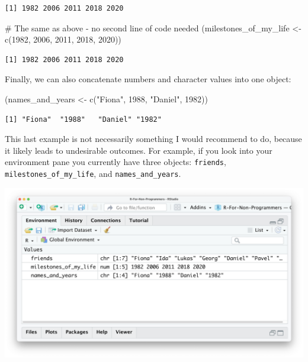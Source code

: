 \documentclass[
  letterpaper,
]{krantz}
\makeatletter
\newenvironment{Shaded}{\begin{snugshade}}{\end{snugshade}}
\newcommand{\CommentTok}[1]{\textcolor[rgb]{0.37,0.37,0.37}{#1}}
\newcommand{\DecValTok}[1]{\textcolor[rgb]{0.68,0.00,0.00}{#1}}
\newcommand{\FunctionTok}[1]{\textcolor[rgb]{0.28,0.35,0.67}{#1}}
\newcommand{\NormalTok}[1]{\textcolor[rgb]{0.00,0.23,0.31}{#1}}
\newcommand{\OtherTok}[1]{\textcolor[rgb]{0.00,0.23,0.31}{#1}}
\newcommand{\StringTok}[1]{\textcolor[rgb]{0.13,0.47,0.30}{#1}}
\newenvironment{kframe}{%
\medskip{}
\setlength{\fboxsep}{.8em}
 \def\at@end@of@kframe{}%
 \ifinner\ifhmode%
  \def\at@end@of@kframe{\end{minipage}}%
  \begin{minipage}{\columnwidth}%
 \fi\fi%
 \def\FrameCommand##1{\hskip\@totalleftmargin \hskip-\fboxsep
 \colorbox{shadecolor}{##1}\hskip-\fboxsep
     \hskip-\linewidth \hskip-\@totalleftmargin \hskip\columnwidth}%
 \MakeFramed {\advance\hsize-\width
   \@totalleftmargin\z@ \linewidth\hsize
   \@setminipage}}%
 {\par\unskip\endMakeFramed%
 \at@end@of@kframe}
\renewenvironment{Shaded}{\begin{kframe}}{\end{kframe}}
\makeatother
\begin{document}
\begin{verbatim}
[1] 1982 2006 2011 2018 2020
\end{verbatim}

\begin{Shaded}
\begin{Highlighting}[]
\CommentTok{\# The same as above {-} no second line of code needed}
\NormalTok{(milestones\_of\_my\_life }\OtherTok{\textless{}{-}} \FunctionTok{c}\NormalTok{(}\DecValTok{1982}\NormalTok{, }\DecValTok{2006}\NormalTok{, }\DecValTok{2011}\NormalTok{, }\DecValTok{2018}\NormalTok{, }\DecValTok{2020}\NormalTok{))}
\end{Highlighting}
\end{Shaded}

\begin{verbatim}
[1] 1982 2006 2011 2018 2020
\end{verbatim}

Finally, we can also concatenate numbers and character values into one
object:

\begin{Shaded}
\begin{Highlighting}[]
\NormalTok{(names\_and\_years }\OtherTok{\textless{}{-}} \FunctionTok{c}\NormalTok{(}\StringTok{"Fiona"}\NormalTok{, }\DecValTok{1988}\NormalTok{, }\StringTok{"Daniel"}\NormalTok{, }\DecValTok{1982}\NormalTok{))}
\end{Highlighting}
\end{Shaded}

\begin{verbatim}
[1] "Fiona"  "1988"   "Daniel" "1982"  
\end{verbatim}

This last example is not necessarily something I would recommend to do,
because it likely leads to undesirable outcomes. For example, if you
look into your environment pane you currently have three objects:
\texttt{friends}, \texttt{milestones\_of\_my\_life}, and
\texttt{names\_and\_years}.

\includegraphics{images/chapter_05_img/01_basic_computation_environment_objects.png}
\end{document}
